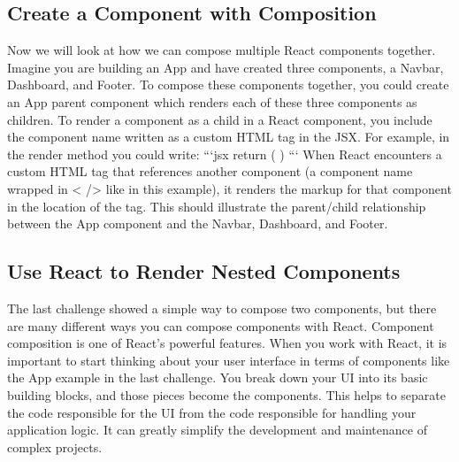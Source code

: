 \documentclass{article}%
\begin{document}
\subsection{Create a Component with Composition}%
\label{subsec:CreateaComponentwithComposition}%
Now we will look at how we can compose multiple React components together. Imagine you are building an App and have created three components, a Navbar, Dashboard, and Footer.\newline%
To compose these components together, you could create an App parent component which renders each of these three components as children. To render a component as a child in a React component, you include the component name written as a custom HTML tag in the JSX. For example, in the render method you could write:\newline%
```jsx\newline%
return (\newline%
 \newline%
\newline%
)\newline%
```\newline%
When React encounters a custom HTML tag that references another component (a component name wrapped in < /> like in this example), it renders the markup for that component in the location of the tag. This should illustrate the parent/child relationship between the App component and the Navbar, Dashboard, and Footer.\newline%

%
\subsection{Use React to Render Nested Components}%
\label{subsec:UseReacttoRenderNestedComponents}%
The last challenge showed a simple way to compose two components, but there are many different ways you can compose components with React.\newline%
Component composition is one of React's powerful features. When you work with React, it is important to start thinking about your user interface in terms of components like the App example in the last challenge. You break down your UI into its basic building blocks, and those pieces become the components. This helps to separate the code responsible for the UI from the code responsible for handling your application logic. It can greatly simplify the development and maintenance of complex projects.\newline%
\end{document}
